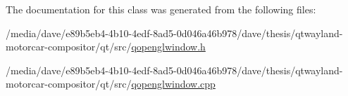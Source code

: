 The documentation for this class was generated from the following files\-:\begin{DoxyCompactItemize}
\item 
/media/dave/e89b5eb4-\/4b10-\/4edf-\/8ad5-\/0d046a46b978/dave/thesis/qtwayland-\/motorcar-\/compositor/qt/src/\hyperlink{qopenglwindow_8h}{qopenglwindow.\-h}\item 
/media/dave/e89b5eb4-\/4b10-\/4edf-\/8ad5-\/0d046a46b978/dave/thesis/qtwayland-\/motorcar-\/compositor/qt/src/\hyperlink{qopenglwindow_8cpp}{qopenglwindow.\-cpp}\end{DoxyCompactItemize}
